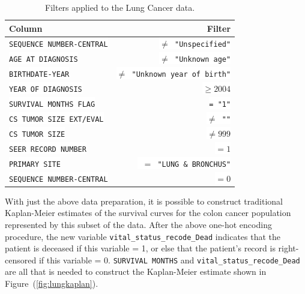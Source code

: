 \documentclass[a4paper,11pt]{article}
\newcommand{\codewhite}[1]{\colorbox{white}{\texttt{#1}}}
\begin{document}
\begin{table}[tbp]
\begin{center}
\begin{tabular}{lr}
\toprule
 Column &  Filter \\
\midrule
\codewhite{SEQUENCE NUMBER-CENTRAL} & \codewhite{$\neq$ "Unspecified"} \\
\codewhite{AGE AT DIAGNOSIS} & \codewhite{$\neq$ "Unknown age"} \\
\codewhite{BIRTHDATE-YEAR} & \codewhite{$\neq$ "Unknown year of birth"} \\
\codewhite{YEAR OF DIAGNOSIS} & \codewhite{$\geq 2004$} \\
\codewhite{SURVIVAL MONTHS FLAG} & \codewhite{= "1"}\\
\codewhite{CS TUMOR SIZE EXT/EVAL} & \codewhite{$\neq$ ""} \\
\codewhite{CS TUMOR SIZE} & \codewhite{$\neq 999$} \\
\codewhite{SEER RECORD NUMBER} & \codewhite{$= 1$} \\
\codewhite{PRIMARY SITE} & \codewhite{ $=$ "LUNG \& BRONCHUS"} \\
\codewhite{SEQUENCE NUMBER-CENTRAL} & \codewhite{$=0$} \\
\bottomrule
\end{tabular}
\caption{\label{tab:lungfilter} Filters applied to the Lung Cancer data.}
\end{center}
\end{table}


With just the above data preparation, it is possible to construct traditional Kaplan-Meier estimates of the survival curves for the colon cancer population represented by this subset of the data.
After the above one-hot encoding procedure, the new variable
\codewhite{vital\_status\_recode\_Dead} indicates that the patient is deceased if this variable = 1, or else that the patient's record is right-censored if this variable = 0.
\codewhite{SURVIVAL MONTHS} and \codewhite{vital\_status\_recode\_Dead} are all that is needed to construct the Kaplan-Meier estimate shown in Figure~(\ref{fig:lungkaplan}).
\end{document}
